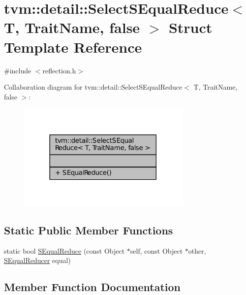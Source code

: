 \hypertarget{structtvm_1_1detail_1_1SelectSEqualReduce_3_01T_00_01TraitName_00_01false_01_4}{}\section{tvm\+:\+:detail\+:\+:Select\+S\+Equal\+Reduce$<$ T, Trait\+Name, false $>$ Struct Template Reference}
\label{structtvm_1_1detail_1_1SelectSEqualReduce_3_01T_00_01TraitName_00_01false_01_4}


{\ttfamily \#include $<$reflection.\+h$>$}



Collaboration diagram for tvm\+:\+:detail\+:\+:Select\+S\+Equal\+Reduce$<$ T, Trait\+Name, false $>$\+:
\nopagebreak
\begin{figure}[H]
\begin{center}
\leavevmode
\includegraphics[width=242pt]{structtvm_1_1detail_1_1SelectSEqualReduce_3_01T_00_01TraitName_00_01false_01_4__coll__graph}
\end{center}
\end{figure}
\subsection*{Static Public Member Functions}
\begin{DoxyCompactItemize}
\item 
static bool \hyperlink{structtvm_1_1detail_1_1SelectSEqualReduce_3_01T_00_01TraitName_00_01false_01_4_a48a6369352bfc09d1f46037bf0988434}{S\+Equal\+Reduce} (const Object $\ast$self, const Object $\ast$other, \hyperlink{classtvm_1_1SEqualReducer}{S\+Equal\+Reducer} equal)
\end{DoxyCompactItemize}


\subsection{Member Function Documentation}
